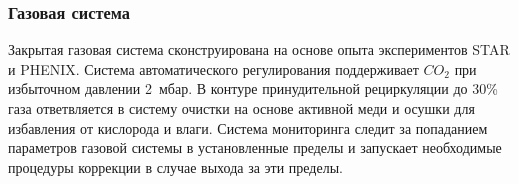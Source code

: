 

\subsubsection{Газовая система}\label{sec:CbmRichGasSystem}


Закрытая газовая система сконструирована на основе опыта экспериментов STAR и PHENIX. Система автоматического регулирования поддерживает $CO_{2}$ при избыточном давлении 2~мбар. В контуре принудительной рециркуляции до 30\% газа ответвляется в систему очистки на основе активной меди и осушки для избавления от кислорода и влаги. Система мониторинга следит за попаданием параметров газовой системы в установленные пределы и запускает необходимые процедуры коррекции в случае выхода за эти пределы.

%                                   


